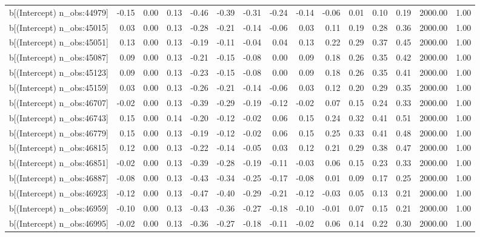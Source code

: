 \begin{table}[ht]
\begin{tabular}{rrrrrrrrrrrrrrr}
  b[(Intercept) n\_obs:44979] & -0.15 & 0.00 & 0.13 & -0.46 & -0.39 & -0.31 & -0.24 & -0.14 & -0.06 & 0.01 & 0.10 & 0.19 & 2000.00 & 1.00 \\ 
  b[(Intercept) n\_obs:45015] & 0.03 & 0.00 & 0.13 & -0.28 & -0.21 & -0.14 & -0.06 & 0.03 & 0.11 & 0.19 & 0.28 & 0.36 & 2000.00 & 1.00 \\ 
  b[(Intercept) n\_obs:45051] & 0.13 & 0.00 & 0.13 & -0.19 & -0.11 & -0.04 & 0.04 & 0.13 & 0.22 & 0.29 & 0.37 & 0.45 & 2000.00 & 1.00 \\ 
  b[(Intercept) n\_obs:45087] & 0.09 & 0.00 & 0.13 & -0.21 & -0.15 & -0.08 & 0.00 & 0.09 & 0.18 & 0.26 & 0.35 & 0.42 & 2000.00 & 1.00 \\ 
  b[(Intercept) n\_obs:45123] & 0.09 & 0.00 & 0.13 & -0.23 & -0.15 & -0.08 & 0.00 & 0.09 & 0.18 & 0.26 & 0.35 & 0.41 & 2000.00 & 1.00 \\ 
  b[(Intercept) n\_obs:45159] & 0.03 & 0.00 & 0.13 & -0.26 & -0.21 & -0.14 & -0.06 & 0.03 & 0.12 & 0.20 & 0.29 & 0.35 & 2000.00 & 1.00 \\ 
  b[(Intercept) n\_obs:46707] & -0.02 & 0.00 & 0.13 & -0.39 & -0.29 & -0.19 & -0.12 & -0.02 & 0.07 & 0.15 & 0.24 & 0.33 & 2000.00 & 1.00 \\ 
  b[(Intercept) n\_obs:46743] & 0.15 & 0.00 & 0.14 & -0.20 & -0.12 & -0.02 & 0.06 & 0.15 & 0.24 & 0.32 & 0.41 & 0.51 & 2000.00 & 1.00 \\ 
  b[(Intercept) n\_obs:46779] & 0.15 & 0.00 & 0.13 & -0.19 & -0.12 & -0.02 & 0.06 & 0.15 & 0.25 & 0.33 & 0.41 & 0.48 & 2000.00 & 1.00 \\ 
  b[(Intercept) n\_obs:46815] & 0.12 & 0.00 & 0.13 & -0.22 & -0.14 & -0.05 & 0.03 & 0.12 & 0.21 & 0.29 & 0.38 & 0.47 & 2000.00 & 1.00 \\ 
  b[(Intercept) n\_obs:46851] & -0.02 & 0.00 & 0.13 & -0.39 & -0.28 & -0.19 & -0.11 & -0.03 & 0.06 & 0.15 & 0.23 & 0.33 & 2000.00 & 1.00 \\ 
  b[(Intercept) n\_obs:46887] & -0.08 & 0.00 & 0.13 & -0.43 & -0.34 & -0.25 & -0.17 & -0.08 & 0.01 & 0.09 & 0.17 & 0.25 & 2000.00 & 1.00 \\ 
  b[(Intercept) n\_obs:46923] & -0.12 & 0.00 & 0.13 & -0.47 & -0.40 & -0.29 & -0.21 & -0.12 & -0.03 & 0.05 & 0.13 & 0.21 & 2000.00 & 1.00 \\ 
  b[(Intercept) n\_obs:46959] & -0.10 & 0.00 & 0.13 & -0.43 & -0.36 & -0.27 & -0.18 & -0.10 & -0.01 & 0.07 & 0.15 & 0.21 & 2000.00 & 1.00 \\ 
  b[(Intercept) n\_obs:46995] & -0.02 & 0.00 & 0.13 & -0.36 & -0.27 & -0.18 & -0.11 & -0.02 & 0.06 & 0.14 & 0.22 & 0.30 & 2000.00 & 1.00 \\ 

\end{tabular}
\end{table}
